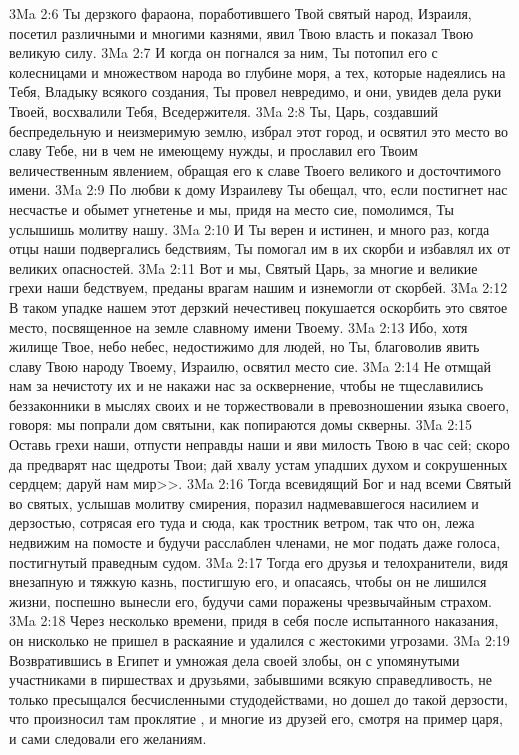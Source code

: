 \vs 3Ma 2:6 Ты дерзкого фараона, поработившего Твой святый народ, Израиля, посетил различными и многими казнями, явил Твою власть и показал Твою великую силу.
\vs 3Ma 2:7 И когда он погнался за ним, Ты потопил его с колесницами и множеством народа во глубине моря, а тех, которые надеялись на Тебя, Владыку всякого создания, Ты провел невредимо, и они, увидев дела руки Твоей, восхвалили Тебя, Вседержителя.
\vs 3Ma 2:8 Ты, Царь, создавший беспредельную и неизмеримую землю, избрал этот город, и освятил это место во славу Тебе, ни в чем не имеющему нужды, и прославил его Твоим величественным явлением, обращая его к славе Твоего великого и досточтимого имени.
\vs 3Ma 2:9 По любви к дому Израилеву Ты обещал, что, если постигнет нас несчастье и обымет угнетенье и мы, придя на место сие, помолимся, Ты услышишь молитву нашу.
\vs 3Ma 2:10 И Ты верен и истинен, и много раз, когда отцы наши подвергались бедствиям, Ты помогал им в их скорби и избавлял их от великих опасностей.
\vs 3Ma 2:11 Вот и мы, Святый Царь, за многие и великие грехи наши бедствуем, преданы врагам нашим и изнемогли от скорбей.
\vs 3Ma 2:12 В таком упадке нашем этот дерзкий нечестивец покушается оскорбить это святое место, посвященное на земле славному имени Твоему.
\vs 3Ma 2:13 Ибо, хотя жилище Твое, небо небес, недостижимо для людей, но Ты, благоволив явить славу Твою народу Твоему, Израилю, освятил место сие.
\vs 3Ma 2:14 Не отмщай нам за нечистоту их и не накажи нас за осквернение, чтобы не тщеславились беззаконники в мыслях своих и не торжествовали в превозношении языка своего, говоря: мы попрали дом святыни, как попираются домы скверны.
\vs 3Ma 2:15 Оставь грехи наши, отпусти неправды наши и яви милость Твою в час сей; скоро да предварят нас щедроты Твои; дай хвалу устам упадших духом и сокрушенных сердцем; даруй нам мир>>.
\vs 3Ma 2:16 Тогда всевидящий Бог и над всеми Святый во святых, услышав молитву смирения, поразил надмевавшегося насилием и дерзостью, сотрясая его туда и сюда, как тростник ветром, так что он, лежа недвижим на помосте и будучи расслаблен членами, не мог подать даже голоса, постигнутый праведным судом.
\vs 3Ma 2:17 Тогда его друзья и телохранители, видя внезапную и тяжкую казнь, постигшую его, и опасаясь, чтобы он не лишился жизни, поспешно вынесли его, будучи сами поражены чрезвычайным страхом.
\vs 3Ma 2:18 Через несколько времени, придя в себя после испытанного наказания, он нисколько не пришел в раскаяние и удалился с жестокими угрозами.
\rsbpar\vs 3Ma 2:19 Возвратившись в Египет и умножая дела своей злобы, он с упомянутыми участниками в пиршествах и друзьями, забывшими всякую справедливость, не только пресыщался бесчисленными студодействами, но дошел до такой дерзости, что произносил там проклятие , и многие из друзей его, смотря на пример царя, и сами следовали его желаниям.
